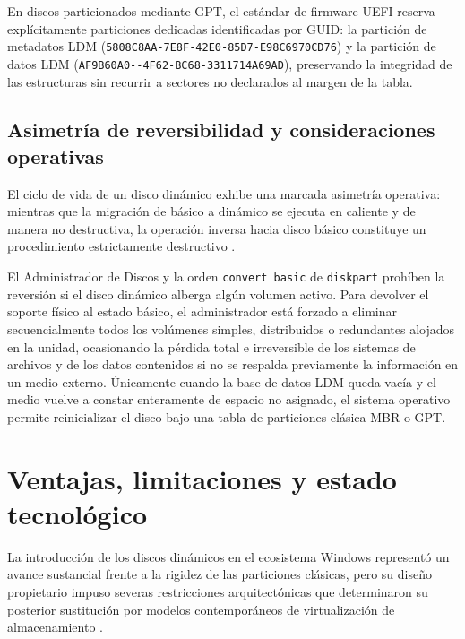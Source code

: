 \documentclass[12pt]{article}
\begin{document}
En discos particionados mediante GPT, el estándar de firmware UEFI reserva explícitamente particiones dedicadas identificadas por GUID: la partición de metadatos LDM (\texttt{5808C8AA-\allowbreak 7E8F-\allowbreak 42E0-\allowbreak 85D7-\allowbreak E98C6970CD76}) y la partición de datos LDM (\texttt{AF9B60A0--\allowbreak 4F62-\allowbreak BC68-\allowbreak 3311714A69AD}), preservando la integridad de las estructuras sin recurrir a sectores no declarados al margen de la tabla.

\subsection{Asimetría de reversibilidad y consideraciones operativas}
\label{subsec:asimetriaReversibilidad}

El ciclo de vida de un disco dinámico exhibe una marcada asimetría operativa: mientras que la migración de básico a dinámico se ejecuta en caliente y de manera no destructiva, la operación inversa hacia disco básico constituye un procedimiento estrictamente destructivo \parencite{microsoft2024basicdynamic}.

El Administrador de Discos y la orden \texttt{convert basic} de \texttt{diskpart} prohíben la reversión si el disco dinámico alberga algún volumen activo. Para devolver el soporte físico al estado básico, el administrador está forzado a eliminar secuencialmente todos los volúmenes simples, distribuidos o redundantes alojados en la unidad, ocasionando la pérdida total e irreversible de los sistemas de archivos y de los datos contenidos si no se respalda previamente la información en un medio externo. Únicamente cuando la base de datos LDM queda vacía y el medio vuelve a constar enteramente de espacio no asignado, el sistema operativo permite reinicializar el disco bajo una tabla de particiones clásica MBR o GPT.

\section{Ventajas, limitaciones y estado tecnológico}
\label{sec:ventajasLimitacionesEstado}

La introducción de los discos dinámicos en el ecosistema Windows representó un avance sustancial frente a la rigidez de las particiones clásicas, pero su diseño propietario impuso severas restricciones arquitectónicas que determinaron su posterior sustitución por modelos contemporáneos de virtualización de almacenamiento \parencite{microsoft2024basicdynamic}.
\end{document}
